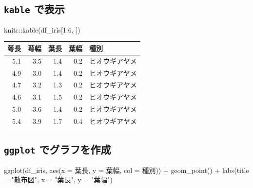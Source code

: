 \documentclass[
]{bxjsbook}
\newenvironment{Shaded}{\begin{snugshade}}{\end{snugshade}}
\newcommand{\AttributeTok}[1]{\textcolor[rgb]{0.77,0.63,0.00}{#1}}
\newcommand{\DecValTok}[1]{\textcolor[rgb]{0.00,0.00,0.81}{#1}}
\newcommand{\FunctionTok}[1]{\textcolor[rgb]{0.00,0.00,0.00}{#1}}
\newcommand{\NormalTok}[1]{#1}
\newcommand{\SpecialCharTok}[1]{\textcolor[rgb]{0.00,0.00,0.00}{#1}}
\newcommand{\StringTok}[1]{\textcolor[rgb]{0.31,0.60,0.02}{#1}}
\theoremstyle{definition}
\theoremstyle{definition}
\theoremstyle{definition}
\theoremstyle{definition}
\theoremstyle{remark}
\begin{document}
\hypertarget{kable-ux3067ux8868ux793a}{%
\subsection{\texorpdfstring{\texttt{kable} で表示}{kable で表示}}\label{kable-ux3067ux8868ux793a}}

\begin{Shaded}
\begin{Highlighting}[]
\NormalTok{knitr}\SpecialCharTok{::}\FunctionTok{kable}\NormalTok{(df\_iris[}\DecValTok{1}\SpecialCharTok{:}\DecValTok{6}\NormalTok{, ])}
\end{Highlighting}
\end{Shaded}

\begin{tabular}{r|r|r|r|l}
\hline
萼長 & 萼幅 & 葉長 & 葉幅 & 種別\\
\hline
5.1 & 3.5 & 1.4 & 0.2 & ヒオウギアヤメ\\
\hline
4.9 & 3.0 & 1.4 & 0.2 & ヒオウギアヤメ\\
\hline
4.7 & 3.2 & 1.3 & 0.2 & ヒオウギアヤメ\\
\hline
4.6 & 3.1 & 1.5 & 0.2 & ヒオウギアヤメ\\
\hline
5.0 & 3.6 & 1.4 & 0.2 & ヒオウギアヤメ\\
\hline
5.4 & 3.9 & 1.7 & 0.4 & ヒオウギアヤメ\\
\hline
\end{tabular}

\hypertarget{ggplot-ux3067ux30b0ux30e9ux30d5ux3092ux4f5cux6210}{%
\subsection{\texorpdfstring{\texttt{ggplot} でグラフを作成}{ggplot でグラフを作成}}\label{ggplot-ux3067ux30b0ux30e9ux30d5ux3092ux4f5cux6210}}

\begin{Shaded}
\begin{Highlighting}[]
\FunctionTok{ggplot}\NormalTok{(df\_iris, }\FunctionTok{aes}\NormalTok{(}\AttributeTok{x =} \StringTok{\textasciigrave{}}\AttributeTok{葉長}\StringTok{\textasciigrave{}}\NormalTok{, }\AttributeTok{y =} \StringTok{\textasciigrave{}}\AttributeTok{葉幅}\StringTok{\textasciigrave{}}\NormalTok{, }\AttributeTok{col =} \StringTok{\textasciigrave{}}\AttributeTok{種別}\StringTok{\textasciigrave{}}\NormalTok{)) }\SpecialCharTok{+}
  \FunctionTok{geom\_point}\NormalTok{() }\SpecialCharTok{+} \FunctionTok{labs}\NormalTok{(}\AttributeTok{title =} \StringTok{"散布図"}\NormalTok{, }\AttributeTok{x =} \StringTok{"葉長"}\NormalTok{, }\AttributeTok{y =} \StringTok{"葉幅"}\NormalTok{)}
\end{Highlighting}
\end{Shaded}
\end{document}
